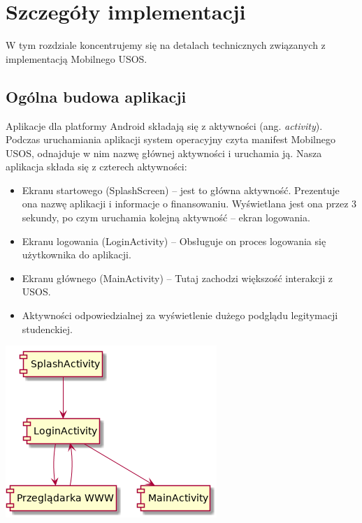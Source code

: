 \documentclass{pracamgr}
\begin{document}
\chapter{Szczegóły implementacji}

W tym rozdziale koncentrujemy się na detalach technicznych związanych z implementacją
Mobilnego USOS.

\section{Ogólna budowa aplikacji}

Aplikacje dla platformy Android składają się z aktywności (ang. \textit{activity}).
Podczas uruchamiania aplikacji system operacyjny czyta manifest Mobilnego USOS,
odnajduje w nim nazwę głównej aktywności i uruchamia ją. Nasza aplikacja składa
się z czterech aktywności:

\begin{itemize}
	\item Ekranu startowego (SplashScreen) -- jest to główna aktywność.
	      Prezentuje ona nazwę aplikacji i informacje o finansowaniu. Wyświetlana
	      jest ona przez 3 sekundy, po czym uruchamia kolejną aktywność -- ekran
	      logowania.
	\item Ekranu logowania (LoginActivity) -- Obsługuje on proces logowania się
	      użytkownika do aplikacji.
	\item Ekranu głównego (MainActivity) -- Tutaj zachodzi większość interakcji
	      z USOS.
	\item Aktywności odpowiedzialnej za wyświetlenie dużego podglądu legitymacji
	      studenckiej.
\end{itemize}

\begingroup
\centering
\includegraphics[scale=0.5]{img/activities.png}
\label{fig:activities}
\medskip
\endgroup
\end{document}
